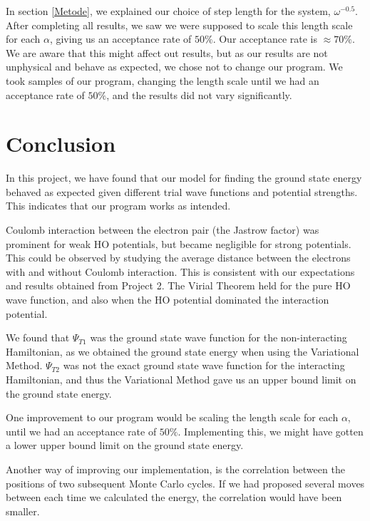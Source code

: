 \documentclass[norsk,a4paper,12pt]{article}
\begin{document}
In section \ref{Metode}, we explained our choice of step length for the system,  $\omega^{-0.5}$. After completing all results, we saw we were supposed to scale this length scale for each $\alpha$, giving us an acceptance rate of $50 \%$. Our acceptance rate is $\approx 70 \%$. We are aware that this might affect out results, but as our results are not unphysical and behave as expected, we chose not to change our program. We took samples of our program, changing the length scale until we had an acceptance rate of $50 \%$, and the results did not vary significantly. 

\section{Conclusion} \label{Conclusion}

In this project, we have found that our model for finding the ground state energy behaved as expected given different trial wave functions and potential strengths. This indicates that our program works as intended. \par 
Coulomb interaction between the electron pair (the Jastrow factor) was prominent for weak HO potentials, but became negligible for strong potentials. This could be observed by studying the average distance between the electrons with and without Coulomb interaction. This is consistent with our expectations and results obtained from Project 2. The Virial Theorem held for the pure HO wave function, and also when the HO potential dominated the interaction potential. \par 
We found that $\Psi_{T1}$ was the ground state wave function for the non-interacting Hamiltonian, as we obtained the ground state energy when using the Variational Method. $\Psi_{T2}$ was not the exact ground state wave function for the interacting Hamiltonian, and thus the Variational Method gave us an upper bound limit on the ground state energy. \par
One improvement to our program would be scaling the length scale for each $\alpha$, until we had an acceptance rate of $50 \%$. Implementing this, we might have gotten a lower upper bound limit on the ground state energy. \par 
Another way of improving our implementation, is the correlation between the positions of two subsequent Monte Carlo cycles. If we had proposed several moves between each time we calculated the energy, the correlation would have been smaller.

\newpage
\end{document}
